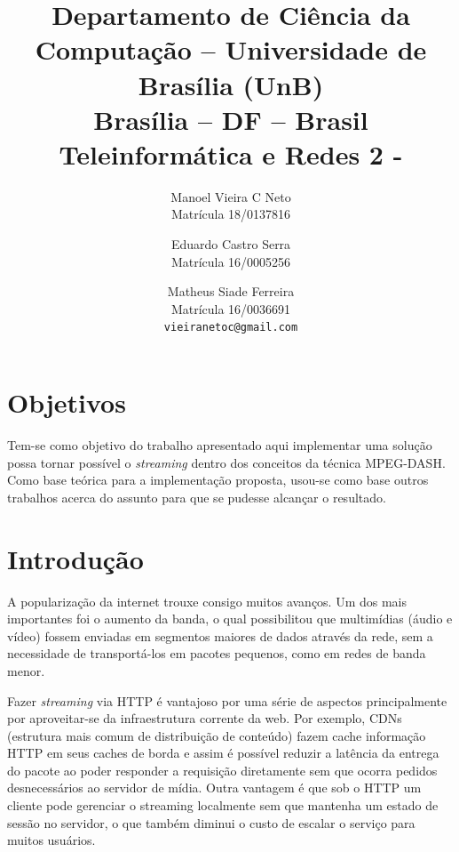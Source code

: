 \documentclass[10pt,twocolumn,letterpaper]{article}
\begin{document}
	
	\title{Departamento de Ciência da Computação -- Universidade de Brasília (UnB)\\
		Brasília -- DF -- Brasil\\
		Teleinformática e Redes 2 - \\
	}
	
	\author{
		Manoel Vieira C Neto\\ 
		Matrícula 18/0137816\\
		\and
	}

	\author{
		Eduardo Castro Serra\\ 
		Matrícula 16/0005256\\
		\and
	}

	\author{
		Matheus Siade Ferreira\\ 
		Matrícula 16/0036691\\
		{\tt\small vieiranetoc@gmail.com}
		\and
	}
	\maketitle
	
	\section{Objetivos}
	Tem-se como objetivo do trabalho apresentado aqui implementar uma solução possa tornar possível o \textit{streaming} dentro dos conceitos da técnica MPEG-DASH. Como base teórica para a implementação proposta, usou-se como base outros trabalhos acerca do assunto para que se pudesse alcançar o resultado\cite{li2014probe}. 
	\section{Introdução}
	A popularização da internet trouxe consigo muitos avanços. Um dos mais importantes foi o aumento da banda, o qual possibilitou que multimídias (áudio e vídeo) fossem enviadas em segmentos maiores de dados através da rede, sem a necessidade de transportá-los em pacotes pequenos, como em redes de banda menor.
	
	Fazer \textit{streaming} via HTTP é vantajoso por uma série de aspectos principalmente por aproveitar-se da infraestrutura corrente da web\cite{niamut2016mpeg}. Por exemplo, CDNs (estrutura mais comum de distribuição de conteúdo) fazem cache informação HTTP em seus caches de borda e assim é possível reduzir a latência da entrega do pacote ao poder responder a requisição diretamente sem que ocorra pedidos desnecessários ao servidor de mídia. Outra vantagem é que sob o HTTP um cliente pode gerenciar o streaming localmente sem que mantenha um estado de sessão no servidor, o que também diminui o custo de escalar o serviço para muitos usuários.
	
\end{document}
